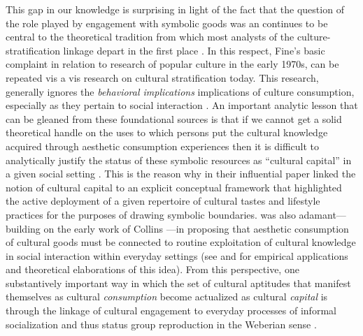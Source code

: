 This gap in our knowledge is surprising in light of the fact that the question of the role played by engagement with symbolic goods was an continues to be central to the theoretical tradition from which most analysts of the culture-stratification linkage depart in the first place \citep{collins75, dimaggio87, douglas_isherwood96, fine77}.  In this respect, Fine's basic complaint in relation to research of popular culture in the early 1970s, can be repeated vis a vis research on cultural stratification today.  This research, generally ignores the \emph{behavioral implications} implications of culture consumption, especially as they pertain to social interaction \citep[453]{fine77}. An important analytic lesson that can be gleaned from these foundational sources is that if we cannot get a solid theoretical handle on the uses to which persons put the cultural knowledge acquired through aesthetic consumption experiences then it is difficult to analytically justify the status of these symbolic resources as ``cultural capital'' in a given social setting \citep{mohr_dimaggio95, dimaggio96, dimaggio00, carter03}.  This is the reason why in their influential paper \citet{lamont_lareau88} linked the notion of cultural capital to an explicit conceptual framework that highlighted the active deployment of a given repertoire of cultural tastes and lifestyle practices for the purposes of drawing symbolic boundaries.  \citet{dimaggio87, dimaggio00} was also adamant---building on the early work of Collins \citeyearpar{collins75}---in proposing that aesthetic consumption of cultural goods must be connected to routine exploitation of cultural knowledge in social interaction within everyday settings (see \citet{erickson96} and \citet{lizardo06a} for empirical applications and theoretical elaborations of this idea). From this perspective, one substantively important way in which the set of cultural aptitudes that manifest themselves as cultural \emph{consumption} become actualized as cultural \emph{capital} is through the linkage of cultural engagement to everyday processes of informal socialization and thus status group reproduction in the Weberian sense \citep{dimaggio_mohr85, dimaggio96}.

